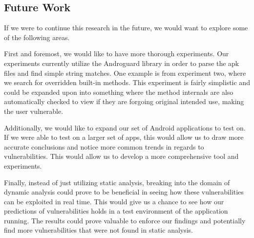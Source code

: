 \subsection{Future Work}
If we were to continue this research in the future, we would 
want to explore some of the following areas. 

First and foremost, we would like to have more thorough experiments. 
Our experiments currently utilize the Androguard library in 
order to parse the apk files and find simple string matches. 
One example is from experiment two, where we search for 
overridden built-in methods. This experiment is fairly simplistic
and could be expanded upon into something where the method 
internals are also automatically checked to view if they are 
forgoing original intended use, making the user vulnerable.

Additionally, we would like to expand our set of Android 
applications to test on. If we were able to test on a larger 
set of apps, this would allow us to draw more accurate 
conclusions and notice more common trends in regards to 
vulnerabilities. This would allow us to develop a more 
comprehensive tool and experiments. 

Finally, instead of just utilizing static analysis, breaking 
into the domain of dynamic analysis could prove to be beneficial 
in seeing how these vulnerabilities can be exploited in real time. 
This would give us a chance to see how our predictions of 
vulnerabilities holds in a test environment of the application 
running. The results could prove valuable to enforce our 
findings and potentially find more vulnerabilities that were 
not found in static analysis. 
